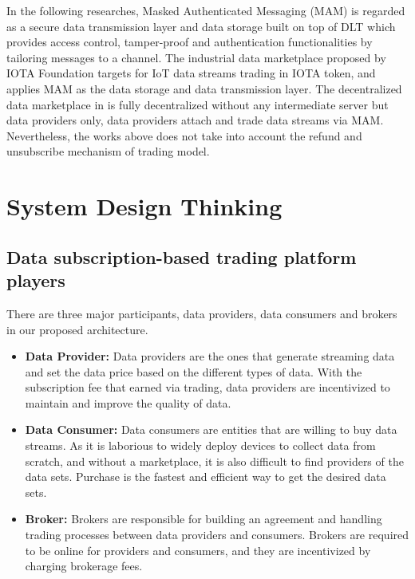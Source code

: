 \documentclass[conference]{IEEEtran}
\begin{document}
In the following researches, Masked Authenticated Messaging (MAM)\cite{MAM} is regarded as a secure data transmission layer and data storage built on top of DLT which provides access control, tamper-proof and authentication functionalities by tailoring messages to a channel. The industrial data marketplace\cite{IOTAIdustryMarketplace} proposed by IOTA Foundation targets for IoT data streams trading in IOTA token, and applies MAM as the data storage and data transmission layer. The decentralized data marketplace in \cite{DDMSmartCities} is fully decentralized without any intermediate server but data providers only, data providers attach and trade data streams via MAM. Nevertheless, the works above does not take into account the refund and unsubscribe mechanism of trading model.
 
\section{System Design Thinking}
\label{section:design_thinking}
\subsection{Data subscription-based trading platform players}
There are three major participants, data providers, data consumers and brokers in our proposed architecture.

\begin{itemize}
\item \textbf{Data Provider: }
Data providers are the ones that generate streaming data and set the data price based on the different types of data. With the subscription fee that earned via trading, data providers are incentivized to maintain and improve the quality of data.
\item \textbf{Data Consumer: }
Data consumers are entities that are willing to buy data streams. As it is laborious to widely deploy devices to collect data from scratch, and without a marketplace, it is also difficult to find providers of the data sets. Purchase is the fastest and efficient way to get the desired data sets.
\item \textbf{Broker: }
Brokers are responsible for building an agreement and handling trading processes between data providers and consumers. Brokers are required to be online for providers and consumers, and they are incentivized by charging brokerage fees.
\end{itemize}
\end{document}
